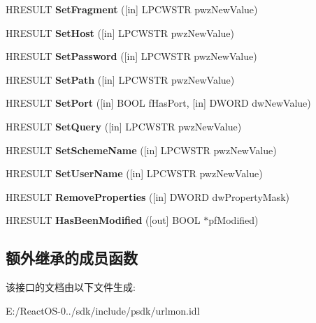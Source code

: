\begin{DoxyCompactItemize}
\mbox{\label{interface_i_uri_builder_a2f919aec2232d05eea14f93c5aa758b7}} 
H\+R\+E\+S\+U\+LT {\bfseries Set\+Fragment} (\mbox{[}in\mbox{]} L\+P\+C\+W\+S\+TR pwz\+New\+Value)
\item 
\mbox{\label{interface_i_uri_builder_a471dfdbb0217c4ac675de39dc667b1a1}} 
H\+R\+E\+S\+U\+LT {\bfseries Set\+Host} (\mbox{[}in\mbox{]} L\+P\+C\+W\+S\+TR pwz\+New\+Value)
\item 
\mbox{\label{interface_i_uri_builder_acebae7a434ec834a6a582772b13dc83e}} 
H\+R\+E\+S\+U\+LT {\bfseries Set\+Password} (\mbox{[}in\mbox{]} L\+P\+C\+W\+S\+TR pwz\+New\+Value)
\item 
\mbox{\label{interface_i_uri_builder_a4fe99c788efd6839dbc0a21dd277c031}} 
H\+R\+E\+S\+U\+LT {\bfseries Set\+Path} (\mbox{[}in\mbox{]} L\+P\+C\+W\+S\+TR pwz\+New\+Value)
\item 
\mbox{\label{interface_i_uri_builder_a7701c8d2fdc9a52aa3b30604f2dd0181}} 
H\+R\+E\+S\+U\+LT {\bfseries Set\+Port} (\mbox{[}in\mbox{]} B\+O\+OL f\+Has\+Port, \mbox{[}in\mbox{]} D\+W\+O\+RD dw\+New\+Value)
\item 
\mbox{\label{interface_i_uri_builder_afe3b36e56dd9ea66df4c338d73a626f8}} 
H\+R\+E\+S\+U\+LT {\bfseries Set\+Query} (\mbox{[}in\mbox{]} L\+P\+C\+W\+S\+TR pwz\+New\+Value)
\item 
\mbox{\label{interface_i_uri_builder_ad362e41a38703c5a5fc3de972b521fe6}} 
H\+R\+E\+S\+U\+LT {\bfseries Set\+Scheme\+Name} (\mbox{[}in\mbox{]} L\+P\+C\+W\+S\+TR pwz\+New\+Value)
\item 
\mbox{\label{interface_i_uri_builder_a64885291e3f4ab6b4b5b179841faa83f}} 
H\+R\+E\+S\+U\+LT {\bfseries Set\+User\+Name} (\mbox{[}in\mbox{]} L\+P\+C\+W\+S\+TR pwz\+New\+Value)
\item 
\mbox{\label{interface_i_uri_builder_a72edb06e6314366e2e426476311715ae}} 
H\+R\+E\+S\+U\+LT {\bfseries Remove\+Properties} (\mbox{[}in\mbox{]} D\+W\+O\+RD dw\+Property\+Mask)
\item 
\mbox{\label{interface_i_uri_builder_a684f774c1cb953a1503a58108717fbc9}} 
H\+R\+E\+S\+U\+LT {\bfseries Has\+Been\+Modified} (\mbox{[}out\mbox{]} B\+O\+OL $\ast$pf\+Modified)
\end{DoxyCompactItemize}
\subsection*{额外继承的成员函数}


该接口的文档由以下文件生成\+:\begin{DoxyCompactItemize}
\item 
E\+:/\+React\+O\+S-\/0../sdk/include/psdk/urlmon.\+idl\end{DoxyCompactItemize}
